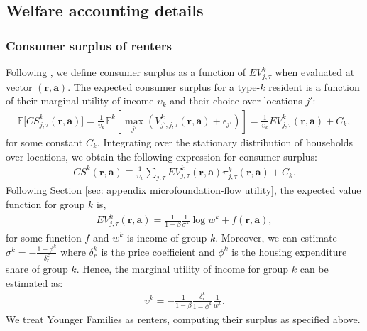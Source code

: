 \documentclass[11pt]{article}
\begin{document}
\subsection{Welfare accounting details}\label{sec:appendix_measuring_welfare}

\subsubsection{Consumer surplus of renters}
\label{sec:consumer_surplus_residents}
Following \cite{train}, we define consumer surplus as a function of $EV^k_{j, \tau}$ when evaluated at vector $(\mathbf{r}, \mathbf{a})$. The expected consumer surplus for a type-$k$ resident is a function of their marginal utility of income $\upsilon_k$ and their choice over locations $j'$:
\begin{align*}    
    \mathbb{E}\big[CS^k_{j, \tau}(\mathbf{r}, \mathbf{a})\big] = \frac{1}{\upsilon_k} \mathbb{E}^{k}\left[\max_{j'} \left({V^k_{j', j, \tau}}(\mathbf{r}, \mathbf{a}) + \epsilon_{j'}\right)\right] = \frac{1}{\upsilon_k} EV^k_{j, \tau}(\mathbf{r}, \mathbf{a}) + C_k,
\end{align*}
for some constant $C_k$. Integrating over the stationary distribution of households over locations, we obtain the following expression for consumer surplus:
\begin{align*}
    CS^k(\mathbf{r},\mathbf{a}) \equiv \frac{1}{\upsilon_k} \sum_{j,\tau} EV^k_{j,\tau} (\mathbf{r},\mathbf{a}) \pi_{j,\tau}^k(\mathbf{r},\mathbf{a}) + C_k.
\end{align*}
Following Section \ref{sec: appendix microfoundation-flow utility}, the expected value function for group $k$ is,
\begin{align*}
    EV^k_{j, \tau}(\mathbf{r}, \mathbf{a}) = \frac{1}{1-\beta}\frac{1}{\sigma^k}\log w^k + f(\mathbf{r}, \mathbf{a}),
\end{align*}
for some function $f$ and $w^k$ is income of group $k$. Moreover, we can estimate $\sigma^k = -\frac{1-\phi^k}{\delta_r^k}$ where $\delta^k_r$ is the price coefficient and $\phi^k$ is the housing expenditure share of group $k$. Hence, the marginal utility of income for group $k$ can be estimated as:
\begin{align}\label{equation: alternative marginal utility}
    \upsilon^k = -\frac{1}{1-\beta}\frac{\delta^k_r}{1-\phi^k }\frac{1}{w^k}.
\end{align}
We treat Younger Families as renters, computing their surplus as specified above.
\end{document}
